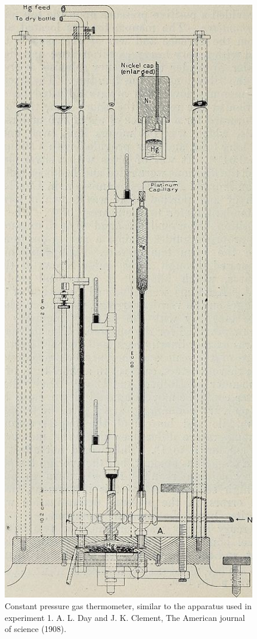 \documentclass[%
 aip,
 jmp,%
 amsmath,amssymb,
 reprint,%
]{revtex4-1}
\begin{document}
  \begin{figure}[!h]
    \centering
    \includegraphics[scale=.3]{const_P_thermom.jpg}
    \caption{Constant pressure gas thermometer, similar to the apparatus used in experiment 1. A. L. Day and J. K. Clement, The American journal of science (1908).}
    \label{const_P}
  \end{figure}
\end{document}

